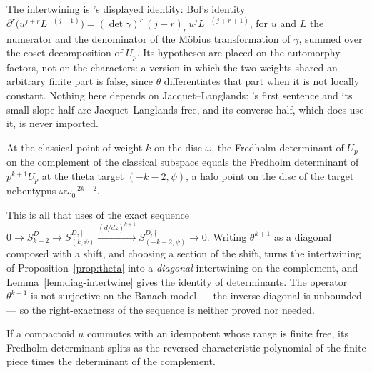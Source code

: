 The intertwining is \cite[\S7]{Bu04}'s displayed identity: Bol's identity
$\partial^{r}\bigl(u^{j+r}L^{-(j+1)}\bigr) = (\det\gamma)^{r}\,(j+r)_{r}\,u^{j}L^{-(j+r+1)}$, for
$u$ and $L$ the numerator and the denominator of the M\"obius transformation of $\gamma$, summed
over the coset decomposition of $U_p$.  Its hypotheses are placed on the automorphy factors, not on
the characters: a version in which the two weights shared an arbitrary finite part is false, since
$\theta$ differentiates that part when it is not locally constant.  Nothing here depends on
Jacquet--Langlands: \cite[Proposition 4]{Bu04}'s first sentence and its small-slope half are
Jacquet--Langlands-free, and its converse half, which does use it, is never imported.

\begin{proposition}
  \label{prop:theta-exact}
  \leanok
  At the classical point of weight $k$ on the disc $\omega$, the Fredholm determinant of $U_p$ on
  the complement of the classical subspace equals the Fredholm determinant of $p^{k+1}U_p$ at the
  theta target $(-k-2,\psi)$, a halo point on the disc of the target nebentypus
  $\omega\omega_0^{-2k-2}$.
\end{proposition}

This is all that \cite[\S3.23 Step III]{LWX} uses of the exact sequence
$0 \to S^{D}_{k+2} \to S^{D,\dagger}_{(k,\psi)} \xrightarrow{(d/dz)^{k+1}}
S^{D,\dagger}_{(-k-2,\psi)} \to 0$.  Writing $\theta^{k+1}$ as a diagonal composed with a shift,
and choosing a section of the shift, turns the intertwining of Proposition~\ref{prop:theta} into
a \emph{diagonal} intertwining on the complement, and Lemma~\ref{lem:diag-intertwine} gives the
identity of determinants.  The operator $\theta^{k+1}$ is not surjective on the Banach model ---
the inverse diagonal is unbounded --- so the right-exactness of the sequence is neither proved nor
needed.

\begin{proposition}
  \label{prop:finite-factor}
  \leanok
  If a compactoid $u$ commutes with an idempotent whose range is finite free, its Fredholm
  determinant splits as the reversed characteristic polynomial of the finite piece times the
  determinant of the complement.
\end{proposition}


